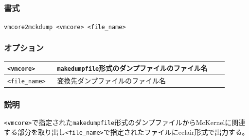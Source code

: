 \documentclass[twoside,11pt,fleqn]{book}
\begin{document}
\subsection{}\label{sec:vmcore2mckdump_if}
\subsubsection*{書式}{\quad} \texttt{vmcore2mckdump <vmcore>  <file\_name>}
\subsubsection*{オプション}{\quad}
\begin{table}[!ht]
\footnotesize
\begin{tabular}{|p{0.20\linewidth}|p{0.70\linewidth}|} \hline
\texttt{<vmcore>}&\texttt{makedumpfile}形式のダンプファイルのファイル名\\ \hline
\texttt{<file\_name>}&変換先ダンプファイルのファイル名\\ \hline
\end{tabular}
\vspace{-0em}
\end{table}
\FloatBarrier

\subsubsection*{説明}{\quad}
\texttt{<vmcore>}で指定された\texttt{makedumpfile}形式のダンプファイルからMcKernelに関連する部分を取り出し\texttt{<file\_name>}で指定されたファイルにeclair形式で出力する。

\section{}
\end{document}
